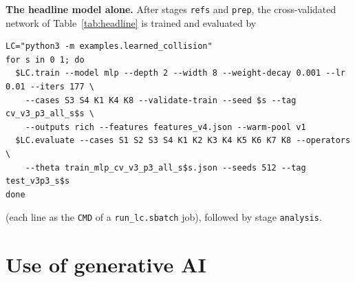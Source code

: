 \documentclass[10pt]{article}
\begin{document}
\textbf{The headline model alone.} After stages \texttt{refs} and \texttt{prep}, the
cross-validated network of Table~\ref{tab:headline} is trained and evaluated by
{\footnotesize
\begin{verbatim}
LC="python3 -m examples.learned_collision"
for s in 0 1; do
  $LC.train --model mlp --depth 2 --width 8 --weight-decay 0.001 --lr 0.01 --iters 177 \
    --cases S3 S4 K1 K4 K8 --validate-train --seed $s --tag cv_v3_p3_all_s$s \
    --outputs rich --features features_v4.json --warm-pool v1
  $LC.evaluate --cases S1 S2 S3 S4 K1 K2 K3 K4 K5 K6 K7 K8 --operators \
    --theta train_mlp_cv_v3_p3_all_s$s.json --seeds 512 --tag test_v3p3_s$s
done
\end{verbatim}}
(each line as the \texttt{CMD} of a \texttt{run\_lc.sbatch} job), followed by stage
\texttt{analysis}.

\section{Use of generative AI}
\end{document}
